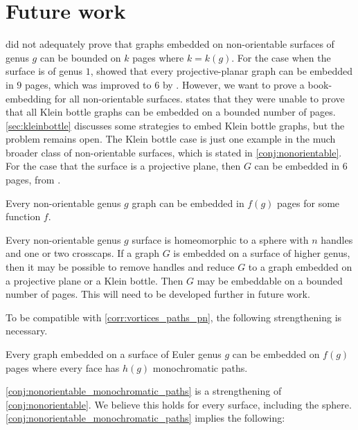 
\section{Future work}

\textcite{heathPagenumberGenusGraphs1992} did not adequately prove that graphs embedded on non-orientable surfaces of genus $g$ can be bounded on $k$ pages where $k = k(g)$. For the case when the surface is of genus $1$, \textcite{nakamotoBookEmbeddingProjectiveplanar2015} showed that every projective-planar graph can be embedded in $9$ pages, which was improved to 6 by \textcite{ozekiBookEmbeddingGraphs2019}. However, we want to prove a book-embedding for all non-orientable surfaces. 
\textcite{ozekiBookEmbeddingGraphs2019} states that they were unable to prove that all Klein bottle graphs can be embedded on a bounded number of pages. \cref{sec:kleinbottle} discusses some strategies to embed Klein bottle graphs, but the problem remains open. The Klein bottle case is just one example in the much broader class of non-orientable surfaces, which is stated in \cref{conj:nonorientable}. For the case that the surface is a projective plane, then $G$ can be embedded in 6 pages, from \textcite{ozekiBookEmbeddingGraphs2019}. 
\begin{conjecture}\label{conj:nonorientable}
	Every non-orientable genus $g$ graph can be embedded in $f(g)$ pages for some function $f$. 
\end{conjecture}

Every non-orientable genus $g$ surface is homeomorphic to a sphere with $n$ handles and one or two crosscaps. If a graph $G$ is embedded on a surface of higher genus, then it may be possible to remove handles and reduce $G$ to a graph embedded on a projective plane or a Klein bottle. Then $G$ may be embeddable on a bounded number of pages. This will need to be developed further in future work.

To be compatible with \cref{corr:vortices_paths_pn}, the following strengthening is necessary. 
\begin{conjecture}\label{conj:nonorientable_monochromatic_paths}
	Every graph embedded on a surface of Euler genus $g$ can be embedded on $f(g)$ pages where every face has $h(g)$ monochromatic paths. 
\end{conjecture}

\cref{conj:nonorientable_monochromatic_paths} is a strengthening of \cref{conj:nonorientable}. We believe this holds for every surface, including the sphere.
\cref{conj:nonorientable_monochromatic_paths} implies the following:

